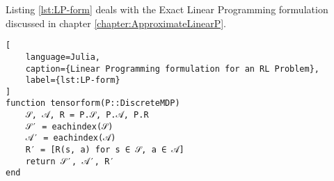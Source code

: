 Listing \ref{lst:LP-form} deals with the Exact Linear Programming formulation
discussed in chapter \ref{chapter:ApproximateLinearP}.

\begin{lstlisting}[
    language=Julia,
    caption={Linear Programming formulation for an RL Problem},
    label={lst:LP-form}
]
function tensorform(P::DiscreteMDP)
    𝒮, 𝒜, R = P.𝒮, P.𝒜, P.R
    𝒮′ = eachindex(𝒮)
    𝒜′ = eachindex(𝒜)
    R′ = [R(s, a) for s ∈ 𝒮, a ∈ 𝒜]
    return 𝒮′, 𝒜′, R′
end
\end{lstlisting}